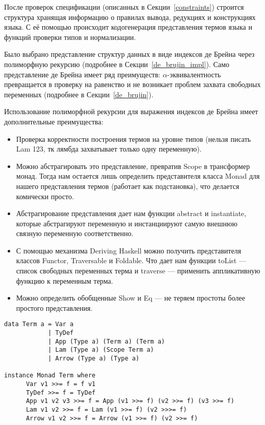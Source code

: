 \hfill

После проверок спецификации (описанных в Секции~\ref{constraints}) строится структура хранящая информацию о правилах вывода, редукциях и конструкциях языка. С её помощью происходит кодогенерация представления термов языка и функций проверки типов и нормализации.

Было выбрано представление структур данных в виде индексов де Брейна\cite{de_brujin} через полиморфную рекурсию (подробнее в Секции~\ref{de_brujin_impl}). Само представление де Брейна имеет ряд преимуществ: $\alpha$-эквивалентность превращается в проверку на равенство и не возникает проблем захвата свободных переменных (подробнее в Секции~\ref{de_brujin}).

Использование полиморфной рекурсии для выражения индексов де Брейна имеет дополнительные преимущества:
\begin{itemize}
  \item Проверка корректности построения термов на уровне типов (нельзя писать Lam 123, тк лямбда захватывает только одну переменную).
  \item Можно абстрагировать это представление, превратив Scope в трансформер монад. Тогда нам остается лишь определить представителя класса Monad для нашего представления термов (работает как подстановка), что делается комически просто.
  \item Абстрагирование представления дает нам функции abstract и instantiate, которые абстрагируют переменную и инстанциируют самую внешнюю связную переменную соответственно.
  \item С помощью механизма Deriving Haskell можно получить представителя классов Functor, Traversable и Foldable. Что дает нам функции toList --- список свободных переменных терма и traverse --- применить аппликативную функцию к переменным терма.
  \item Можно определить обобщенные Show и Eq --- не теряем простоты более простого представления.
\end{itemize}


\begin{lstlisting}[caption={Сгенерированное представление АСТ STLC на Haskell и представитель класса Monad},captionpos=b, frame=single, float, floatplacement=H]
data Term a = Var a
            | TyDef
            | App (Type a) (Term a) (Term a)
            | Lam (Type a) (Scope Term a)
            | Arrow (Type a) (Type a)

instance Monad Term where
      Var v1 >>= f = f v1
      TyDef >>= f = TyDef
      App v1 v2 v3 >>= f = App (v1 >>= f) (v2 >>= f) (v3 >>= f)
      Lam v1 v2 >>= f = Lam (v1 >>= f) (v2 >>>= f)
      Arrow v1 v2 >>= f = Arrow (v1 >>= f) (v2 >>= f)
\end{lstlisting}

